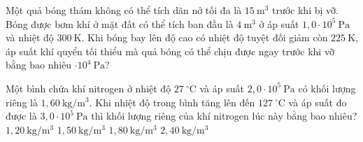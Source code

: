 \begin{ex}
Một quả bóng thám không có thể tích dãn nở tối đa là $15\ \mathrm{m^3}$ trước khi bị vỡ. Bóng được bơm khí ở mặt đất có thể tích ban đầu là $4\ \mathrm{m^3}$ ở áp suất $1,0 \cdot 10^5\ \mathrm{Pa}$ và nhiệt độ $300\ \mathrm{K}$. Khi bóng bay lên độ cao có nhiệt độ tuyệt đối giảm còn $225\ \mathrm{K}$, áp suất khí quyển tối thiểu mà quả bóng có thể chịu được ngay trước khi vỡ bằng bao nhiêu $\cdot 10^4\ \mathrm{Pa}$?
\end{ex}

\begin{ex}
Một bình chứa khí nitrogen ở nhiệt độ $27\ ^\circ\mathrm{C}$ và áp suất $2,0 \cdot 10^5\ \mathrm{Pa}$ có khối lượng riêng là $1,60\ \mathrm{kg/m^3}$. Khi nhiệt độ trong bình tăng lên đến $127\ ^\circ\mathrm{C}$ và áp suất đo được là $3,0 \cdot 10^5\ \mathrm{Pa}$ thì khối lượng riêng của khí nitrogen lúc này bằng bao nhiêu?
\choice
{$1,20\ \mathrm{kg/m^3}$}
{$1,50\ \mathrm{kg/m^3}$}
{\True $1,80\ \mathrm{kg/m^3}$}
{$2,40\ \mathrm{kg/m^3}$}
\end{ex}

